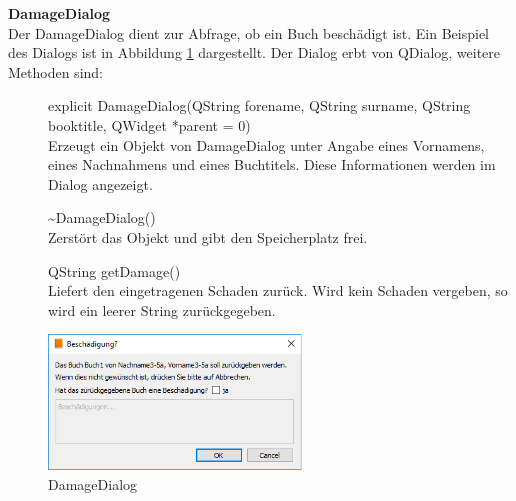 \textbf{DamageDialog}\\
Der DamageDialog dient zur Abfrage, ob ein Buch beschädigt ist. Ein Beispiel des Dialogs ist in Abbildung \ref{fig:DamageDialog} dargestellt. Der Dialog erbt von QDialog, weitere Methoden sind:
\begin{description}
	\item[ ] explicit DamageDialog(QString forename, QString surname, QString booktitle, QWidget *parent = 0)\\
	Erzeugt ein Objekt von DamageDialog unter Angabe eines Vornamens, eines Nachnahmens und eines Buchtitels. Diese Informationen werden im Dialog angezeigt.
	\item[ ] \~{}DamageDialog()\\
	Zerstört das Objekt und gibt den Speicherplatz frei.	
  \item[ ] QString getDamage()\\
	Liefert den eingetragenen Schaden zurück. Wird kein Schaden vergeben, so wird ein leerer String zurückgegeben.
\end{description}
\begin{figure}[htb]
	\centering
		\includegraphics[width=0.60\textwidth]{figures/DamageDialog.png}
	\caption{DamageDialog}
	\label{fig:DamageDialog}
\end{figure} 

